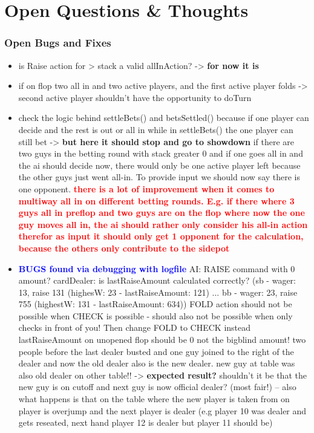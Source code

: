 \pagebreak
\chapter{Open Questions \& Thoughts}
\subsection{Open Bugs and Fixes}
\begin{itemize}
\item is Raise action for > stack a valid allInAction? -> \textbf{for now it is}
\item if on flop two all in and two active players, and the first active player folds -> second active player shouldn't have the opportunity to doTurn
\item check the logic behind settleBets() and betsSettled() because if one player can decide and the rest is out or all in while in settleBets() the one player can still bet -> \textbf{but here it should stop and go to showdown}
\subitem if there are two guys in the betting round with stack greater 0 and if one goes all in and the ai should decide now, there would only be one active player left because the other guys just went all-in. To provide input we should now say there is one opponent.
\subitem \textbf{\textcolor{red}{there is a lot of improvement when it comes to multiway all in on different betting rounds. E.g. if there where 3 guys all in preflop and two guys are on the flop where now the one guy moves all in, the ai should rather only consider his all-in action therefor as input it should only get 1 opponent for the calculation, because the others only contribute to the sidepot}}
\item \textbf{\textcolor{blue}{BUGS found via debugging with logfile}}
\subitem AI: RAISE command with 0 amount?
\subitem cardDealer: is lastRaiseAmount calculated correctly? (sb - wager: 13, raise 131 (highesW: 23 - lastRaiseAmount: 121) ... bb - wager: 23, raise 755 (highestW: 131 - lastRaiseAmount: 634))
\subitem FOLD action should not be possible when CHECK is possible - should also not be possible when only checks in front of you! Then change FOLD to CHECK instead
\subitem lastRaiseAmount on unopened flop should be 0 not the bigblind amount!
\subitem two people before the last dealer busted and one guy joined to the right of the dealer and now the old dealer also is the new dealer. new guy at table was also old dealer on other table!! -> \textbf{expected result?} shouldn't it be that the new guy is on cutoff and next guy is now official dealer? (most fair!) -- also what happens is that on the table where the new player is taken from on player is overjump and the next player is dealer (e.g player 10 was dealer and gets reseated, next hand player 12 is dealer but player 11 should be)\\\\

\end{itemize}

